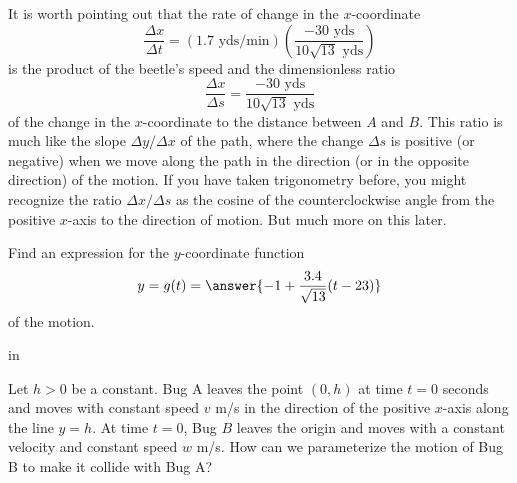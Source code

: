 \documentclass{ximera}
\newcommand{\pskip}{\vskip 0.1 in}
\begin{document}
\begin{explanation}
It is worth pointing out that the rate of change in the $x$-coordinate
\[
    \frac{\Delta x}{\Delta t} = \left( 1.7 \text{ yds/min} \right) \left( \frac{-30 \text{ yds}}{10\sqrt{13} \text{ yds}} \right)
\]
is the product of the beetle's speed and the dimensionless ratio 
\[
     \frac{\Delta x}{\Delta s} = \frac{-30 \text{ yds}}{10\sqrt{13} \text{ yds}}
\]
of the change in the $x$-coordinate to the distance between $A$ and $B$. This ratio is much like the slope $\Delta y / \Delta x$ of the path, where the change $\Delta s$ is positive (or negative) when we move along the path in the direction (or in the opposite direction) of the motion. If you have taken trigonometry before, you might recognize the ratio $\Delta x/\Delta s$ as the cosine of the counterclockwise angle from the positive $x$-axis to the direction of motion. But much more on this later.



\begin{question}
 Find an expression for the $y$-coordinate function  
\[
 y = g(t) =   \answer{-1+\frac{3.4}{\sqrt{13}}( t-23)}
\]
of the motion.
    \end{question}

\end{explanation}


\pskip


\begin{example} \label{Ex4}
 Let $h>0$ be a constant. Bug A leaves the point $(0,h)$ at time $t=0$ seconds and moves with constant speed $v$ m/s in the direction of the positive $x$-axis along the line $y=h$. At time $t=0$, Bug $B$ leaves the origin and moves with a constant velocity and constant speed $w$ m/s. How can we parameterize the motion of Bug B to make it collide with Bug A?
\end{example}
\end{document}
